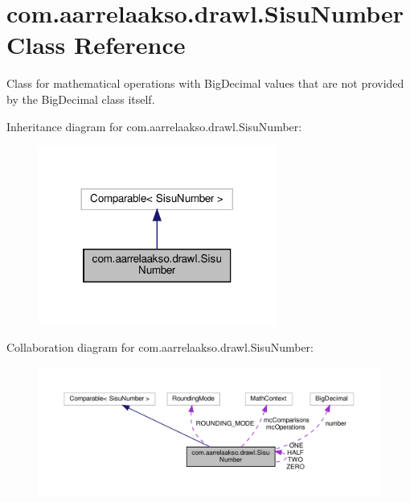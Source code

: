 \hypertarget{classcom_1_1aarrelaakso_1_1drawl_1_1_sisu_number}{}\section{com.\+aarrelaakso.\+drawl.\+Sisu\+Number Class Reference}
\label{classcom_1_1aarrelaakso_1_1drawl_1_1_sisu_number}


Class for mathematical operations with Big\+Decimal values that are not provided by the Big\+Decimal class itself.  




Inheritance diagram for com.\+aarrelaakso.\+drawl.\+Sisu\+Number\+:
\nopagebreak
\begin{figure}[H]
\begin{center}
\leavevmode
\includegraphics[width=221pt]{df/d65/classcom_1_1aarrelaakso_1_1drawl_1_1_sisu_number__inherit__graph}
\end{center}
\end{figure}


Collaboration diagram for com.\+aarrelaakso.\+drawl.\+Sisu\+Number\+:
\nopagebreak
\begin{figure}[H]
\begin{center}
\leavevmode
\includegraphics[width=350pt]{df/d10/classcom_1_1aarrelaakso_1_1drawl_1_1_sisu_number__coll__graph}
\end{center}
\end{figure}
